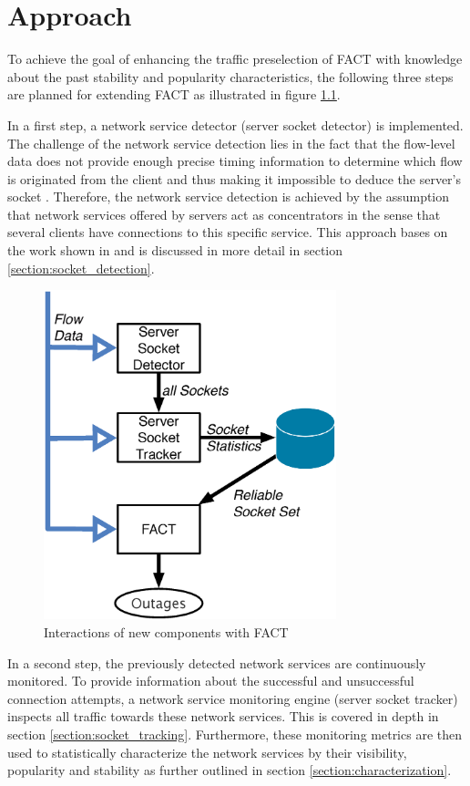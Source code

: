 \chapter{Approach
\label{chapter:approach}}

To achieve the goal of enhancing the traffic preselection of \gls{FACT} with knowledge about the past stability and popularity characteristics, the following three steps are planned for extending \gls{FACT} as illustrated in figure  \ref{fig:FACT}.

In a first step, a network service detector (server socket detector) is  implemented. 
The challenge of the network service detection lies in the fact that the flow-level data does not provide enough precise timing information to determine which flow is originated from the client and thus making it impossible to deduce the server's socket \citep{Schatzmann:Tracing}. 
Therefore, the network service detection is achieved by the assumption that network services offered by servers act as concentrators in the sense that several clients have connections to this specific service. 
This approach bases on the work shown in \cite{Schatzmann:Dissection, Schatzmann:Mining, Schatzmann:Tracing} and is discussed in more detail in section \ref{section:socket_detection}.

\begin{figure}
	[t] \centering
	\includegraphics[width=8.5cm]{images/Approach_blockdiagram.eps}
	\caption{Interactions of new components with \gls{FACT}} 
	\label{fig:FACT} 
\end{figure}

In a second step, the previously detected network services are continuously  monitored. 
To provide information about the successful and unsuccessful connection attempts, a network service monitoring engine (server socket tracker) inspects all traffic towards these network services. This is covered in depth in section \ref{section:socket_tracking}.
Furthermore, these monitoring metrics are then used to statistically characterize the network services by their visibility, popularity and stability as further outlined in section \ref{section:characterization}.

